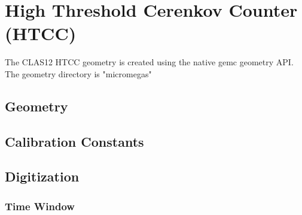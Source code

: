 \section{High Threshold Cerenkov Counter (HTCC)}

The CLAS12 HTCC geometry is created using the native gemc geometry API.
The geometry directory is "micromegas"


\subsection{Geometry}

\subsection{Calibration Constants}


\subsection{Digitization}

\subsubsection{Time Window}


